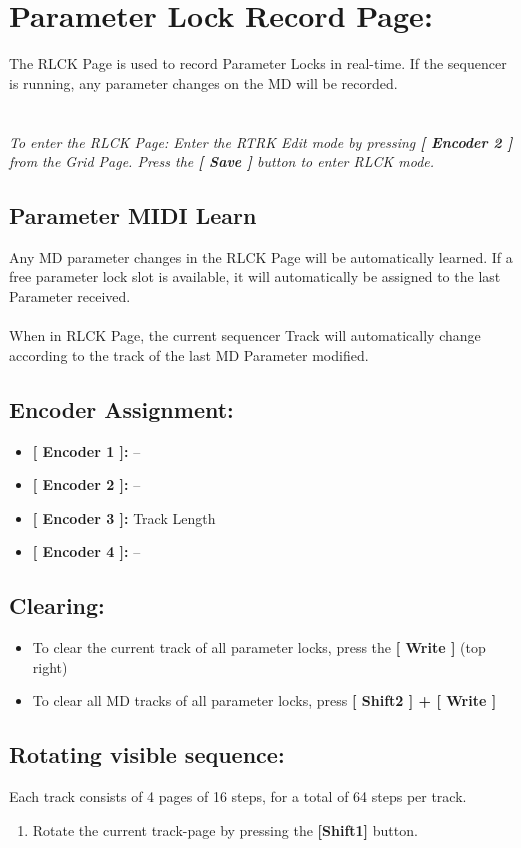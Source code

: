\chapter{Parameter Lock Record  Page:}
The RLCK Page is used to record Parameter Locks in real-time. If the sequencer is running, any parameter changes on the MD will be recorded.\\
\\
\\
\textit{To enter the RLCK Page: Enter the RTRK Edit mode by pressing \textbf{[ Encoder 2 ]} from the Grid Page. Press the \textbf{[ Save ]} button to enter RLCK mode.}
\section{Parameter MIDI Learn}
Any MD parameter changes in the RLCK Page will be automatically learned. If a free parameter lock slot is available, it will automatically be assigned to the last Parameter received. \\
\\
When in RLCK Page, the current sequencer Track will automatically change according to the track of the last MD Parameter modified. 

\section{Encoder Assignment:}
\begin{itemize}
	\item \textbf{[ Encoder 1 ]: } --
	\item \textbf{[ Encoder 2 ]: } --
	\item \textbf{[ Encoder 3 ]: } Track Length
	\item \textbf{[ Encoder 4 ]: } --
\end{itemize}
\section{Clearing:}
\begin{itemize}
\item To clear the current track of all parameter locks, press the \textbf{[ Write ] }(top right)
\item To clear all MD tracks of all parameter locks,  press \textbf{[ Shift2 ] + [ Write ]}
\end{itemize}
\section{Rotating visible sequence:}
Each track consists of 4 pages of 16 steps, for a total of 64 steps per track.
\begin{enumerate}
	\item Rotate the current track-page by pressing the \textbf{[Shift1] }button.
\end{enumerate}
